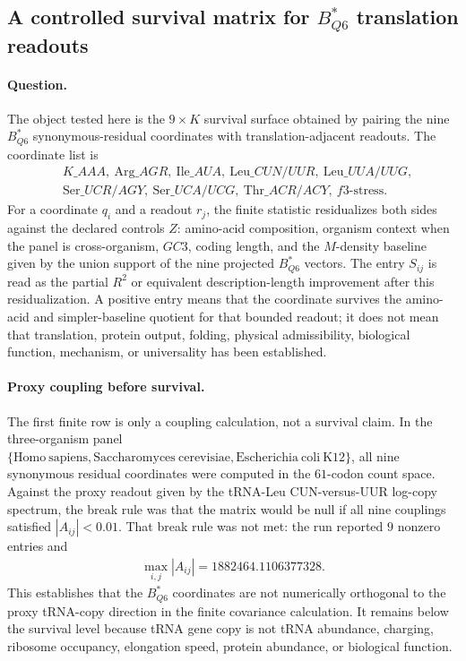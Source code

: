 \subsection{A controlled survival matrix for $B^*_{Q6}$ translation readouts}
\label{sec:translation-survival-b-star-q6-survival-matrix-translation-realization}

\paragraph{Question.}
The object tested here is the $9 \times K$ survival surface obtained by pairing the nine $B^*_{Q6}$ synonymous-residual coordinates with translation-adjacent readouts.  The coordinate list is
$$
\begin{aligned}
&K\_AAA,\ \mathrm{Arg}\_AGR,\ \mathrm{Ile}\_AUA,\ \mathrm{Leu}\_{CUN/UUR},\ \mathrm{Leu}\_{UUA/UUG},\\
&\mathrm{Ser}\_{UCR/AGY},\ \mathrm{Ser}\_{UCA/UCG},\ \mathrm{Thr}\_{ACR/ACY},\ f3\text{-}\mathrm{stress}.
\end{aligned}
$$
For a coordinate $q_i$ and a readout $r_j$, the finite statistic residualizes both sides against the declared controls $Z$: amino-acid composition, organism context when the panel is cross-organism, $GC3$, coding length, and the $M$-density baseline given by the union support of the nine projected $B^*_{Q6}$ vectors.  The entry $S_{ij}$ is read as the partial $R^2$ or equivalent description-length improvement after this residualization.  A positive entry means that the coordinate survives the amino-acid and simpler-baseline quotient for that bounded readout; it does not mean that translation, protein output, folding, physical admissibility, biological function, mechanism, or universality has been established.

\paragraph{Proxy coupling before survival.}
The first finite row is only a coupling calculation, not a survival claim.  In the three-organism panel $\{\mathrm{Homo\ sapiens},\mathrm{Saccharomyces\ cerevisiae},\mathrm{Escherichia\ coli\ K12}\}$, all nine synonymous residual coordinates were computed in the $61$-codon count space.  Against the proxy readout given by the tRNA-Leu CUN-versus-UUR log-copy spectrum, the break rule was that the matrix would be null if all nine couplings satisfied $|A_{ij}|<0.01$.  That break rule was not met: the run reported $9$ nonzero entries and
$$
\begin{aligned}
\max_{i,j}|A_{ij}|=1882464.1106377328.
\end{aligned}
$$
This establishes that the $B^*_{Q6}$ coordinates are not numerically orthogonal to the proxy tRNA-copy direction in the finite covariance calculation.  It remains below the survival level because tRNA gene copy is not tRNA abundance, charging, ribosome occupancy, elongation speed, protein abundance, or biological function.

